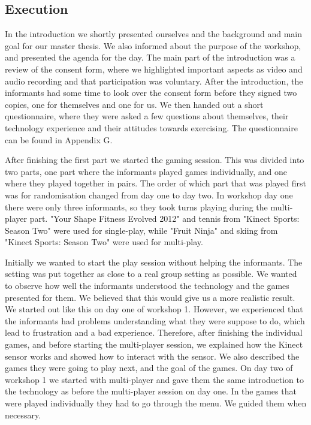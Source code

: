 \subsection{Execution}
In the introduction we shortly presented ourselves and the background and main goal for our master thesis. We also informed about the purpose of the workshop, and presented the agenda for the day. The main part of the introduction was a review of the consent form, where we highlighted important aspects as video and audio recording and that participation was voluntary. After the introduction, the informants had some time to look over the consent form before they signed two copies, one for themselves and one for us. We then handed out a short questionnaire, where they were asked a few questions about themselves, their technology experience and their attitudes towards exercising. The questionnaire can be found in Appendix G.

After finishing the first part we started the gaming session. This was divided into two parts, one part where the informants played games individually, and one where they played together in pairs. The order of which part that was played first was for randomisation changed from day one to day two. In workshop day one there were only three informants, so they took turns playing during the multi-player part. "Your Shape Fitness Evolved 2012" and tennis from "Kinect Sports: Season Two" were used for single-play, while "Fruit Ninja" and skiing from "Kinect Sports: Season Two" were used for multi-play. 

Initially we wanted to start the play session without helping the informants. The setting was put together as close to a real group setting as possible. We wanted to observe how well the informants understood the technology and the games presented for them. We believed that this would give us a more realistic result. We started out like this on day one of workshop 1. However, we experienced that the informants had problems understanding what they were suppose to do, which lead to frustration and a bad experience. Therefore, after finishing the individual games, and before starting the multi-player session, we explained how the Kinect sensor works and showed how to interact with the sensor. We also described the games they were going to play next, and the goal of the games. On day two of workshop 1 we started with multi-player and gave them the same introduction to the technology as before the multi-player session on day one. In the games that were played individually they had to go through the menu. We guided them when necessary. 

